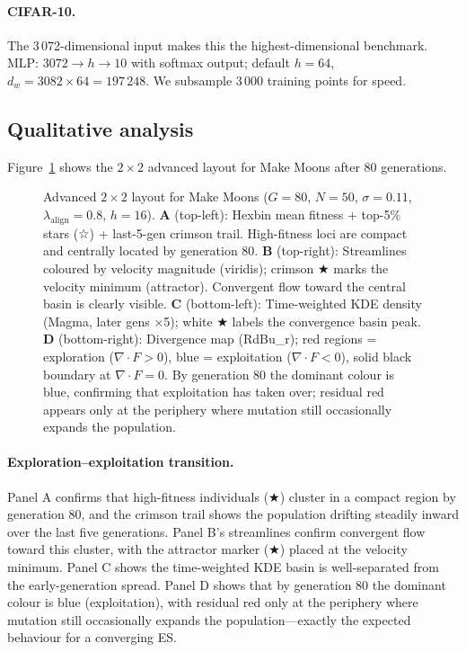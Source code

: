 \documentclass{article}
\begin{document}
\paragraph{CIFAR-10.}
The 3\,072-dimensional input makes this the highest-dimensional benchmark.
MLP: $3072 \to h \to 10$ with softmax output; default $h=64$,
$d_w = 3082 \times 64 = 197\,248$.
We subsample 3\,000 training points for speed.

\subsection{Qualitative analysis}

Figure~\ref{fig:moons_advanced} shows the $2\!\times\!2$ advanced layout for
Make Moons after 80 generations.

\begin{figure}[h]
  \centering
  \fbox{\rule[-.5cm]{0cm}{7cm} \rule[-.5cm]{12cm}{0cm}}
  \caption{Advanced $2\!\times\!2$ layout for Make Moons ($G=80$, $N=50$,
  $\sigma=0.11$, $\lambda_{\text{align}}=0.8$, $h=16$).
  \textbf{A} (top-left): Hexbin mean fitness + top-5\% stars (☆) + last-5-gen
  crimson trail. High-fitness loci are compact and centrally located by
  generation 80.
  \textbf{B} (top-right): Streamlines coloured by velocity magnitude (viridis);
  crimson ★ marks the velocity minimum (attractor). Convergent flow toward the
  central basin is clearly visible.
  \textbf{C} (bottom-left): Time-weighted KDE density (Magma, later gens ×5);
  white ★ labels the convergence basin peak.
  \textbf{D} (bottom-right): Divergence map (RdBu\_r); red regions =
  exploration ($\nabla \cdot F > 0$), blue = exploitation ($\nabla \cdot F < 0$),
  solid black boundary at $\nabla \cdot F = 0$.
  By generation 80 the dominant colour is blue, confirming that exploitation
  has taken over; residual red appears only at the periphery where mutation
  still occasionally expands the population.}
  \label{fig:moons_advanced}
\end{figure}

\paragraph{Exploration--exploitation transition.}
Panel A confirms that high-fitness individuals ($\bigstar$) cluster in a
compact region by generation 80, and the crimson trail shows the population
drifting steadily inward over the last five generations.
Panel B's streamlines confirm convergent flow toward this cluster, with the
attractor marker ($\bigstar$) placed at the velocity minimum.
Panel C shows the time-weighted KDE basin is well-separated from the
early-generation spread.
Panel D shows that by generation 80 the dominant colour is blue
(exploitation), with residual red only at the periphery where mutation still
occasionally expands the population---exactly the expected behaviour for a
converging ES.
\end{document}
